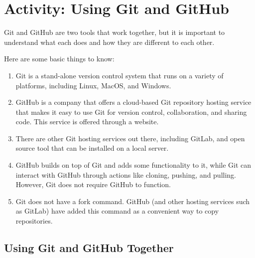 \documentclass[
  letterpaper,
  DIV=11,
  numbers=noendperiod]{scrreport}
\providecommand{\tightlist}{%
  \setlength{\itemsep}{0pt}\setlength{\parskip}{0pt}}\usepackage{longtable,booktabs,array}
\begin{document}
\hypertarget{activity-using-git-and-github}{%
\chapter{Activity: Using Git and
GitHub}\label{activity-using-git-and-github}}

Git and GitHub are two tools that work together, but it is important to
understand what each does and how they are different to each other.

Here are some basic things to know:

\begin{enumerate}
\def\labelenumi{\arabic{enumi}.}
\tightlist
\item
  Git is a stand-alone version control system that runs on a variety of
  platforms, including Linux, MacOS, and Windows.
\item
  GitHub is a company that offers a cloud-based Git repository hosting
  service that makes it easy to use Git for version control,
  collaboration, and sharing code. This service is offered through a
  website.
\item
  There are other Git hosting services out there, including GitLab, and
  open source tool that can be installed on a local server.
\item
  GitHub builds on top of Git and adds some functionality to it, while
  Git can interact with GitHub through actions like cloning, pushing,
  and pulling. However, Git does not require GitHub to function.
\item
  Git does not have a fork command. GitHub (and other hosting services
  such as GitLab) have added this command as a convenient way to copy
  repositories.
\end{enumerate}

\hypertarget{using-git-and-github-together}{%
\section{Using Git and GitHub
Together}\label{using-git-and-github-together}}
\end{document}

